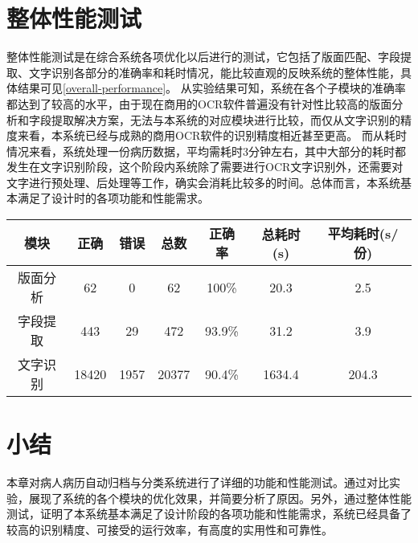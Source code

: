 \section{整体性能测试}
整体性能测试是在综合系统各项优化以后进行的测试，它包括了版面匹配、字段提取、文字识别各部分的准确率和耗时情况，能比较直观的反映系统的整体性能，具体结果可见\autoref{overall-performance}。
从实验结果可知，系统在各个子模块的准确率都达到了较高的水平，由于现在商用的OCR软件普遍没有针对性比较高的版面分析和字段提取解决方案，无法与本系统的对应模块进行比较，而仅从文字识别的精度来看，本系统已经与成熟的商用OCR软件的识别精度相近甚至更高。
而从耗时情况来看，系统处理一份病历数据，平均需耗时3分钟左右，其中大部分的耗时都发生在文字识别阶段，这个阶段内系统除了需要进行OCR文字识别外，还需要对文字进行预处理、后处理等工作，确实会消耗比较多的时间。总体而言，本系统基本满足了设计时的各项功能和性能需求。
\begin{table}[!htbp]
	\label{overall-performance}
	\centering
	\vspace{10pt}
  \renewcommand\arraystretch{1.5}  %
	\begin{tabular}{c|c|c|c|c|c|c}
    \hline
    模块 & 正确 & 错误 & 总数 & 正确率 & 总耗时(s) & 平均耗时(s/份) \\
    \hline
    版面分析 & 62 & 0 & 62 & 100\% & 20.3 & 2.5 \\
    \hline
    字段提取 & 443 & 29 & 472 & 93.9\% & 31.2 & 3.9 \\
    \hline
    文字识别 & 18420 & 1957 & 20377 & 90.4\% & 1634.4 & 204.3 \\
    \hline
	\end{tabular}
\end{table}

\section{小结}
本章对病人病历自动归档与分类系统进行了详细的功能和性能测试。通过对比实验，展现了系统的各个模块的优化效果，并简要分析了原因。另外，通过整体性能测试，证明了本系统基本满足了设计阶段的各项功能和性能需求，系统已经具备了较高的识别精度、可接受的运行效率，有高度的实用性和可靠性。
